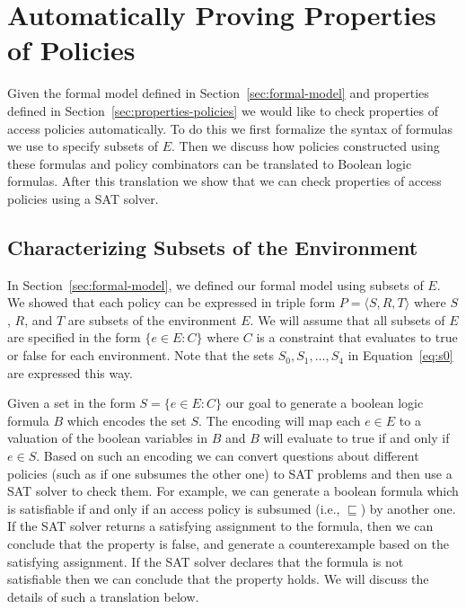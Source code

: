 \section{Automatically Proving Properties of Policies}
\label{sec:autom-prov-prop}

Given the formal model defined in Section~\ref{sec:formal-model} and
properties defined in Section~\ref{sec:properties-policies} we would
like to check properties of access policies automatically.  To do this
we first formalize the syntax of formulas we use to specify subsets of
$E$.  Then we discuss how policies constructed using these formulas
and policy combinators can be translated to Boolean logic formulas.  
After this translation we show that we can 
check properties of access policies using a SAT solver.

\subsection{Characterizing Subsets of the Environment}
\label{sec:policy-classes}

In Section~\ref{sec:formal-model}, we defined our formal model using
subsets of $E$. We showed that each policy can be expressed
in triple form $P= \langle S, R, T \rangle$   where
$S$, $R$, and $T$ are subsets of the environment $E$.
We will assume that all subsets of $E$ are specified in the form $\{ e
\in E : C \}$ where $C$ is a constraint that evaluates to true or
false for each environment.
Note that the sets $S_0, S_1, \dots, S_4$ in
Equation~\eqref{eq:s0} are expressed this way.

Given a set in the form $S = \{ e \in E : C \}$
our goal to generate a boolean logic formula
$B$ which encodes the set $S$.  The encoding will map each $e \in E$
to a valuation of the boolean variables in $B$ and $B$ will evaluate
to true if and only if $e \in S$.  Based on such an encoding we can
convert questions about different policies (such as if one subsumes
the other one) to SAT problems and then use a SAT solver to check
them.  For example, we can generate a boolean formula which is
satisfiable if and only if an access policy is subsumed (i.e.,
$\sqsubseteq$) by another one.  If the SAT solver returns a satisfying
assignment to the formula, then we can conclude that the property is
false, and generate a counterexample based on the satisfying
assignment.  If the SAT solver declares that the formula is not
satisfiable then we can conclude that the property holds.
We will discuss the details of such a translation below.

